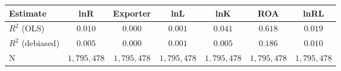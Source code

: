 \begin{tabular}{l*{6}{c}}
\hline\hline
 Estimate & lnR & Exporter & lnL & lnK & ROA & lnRL \\
\hline
\addlinespace $ R^2$ (OLS) & $0.010$ & $0.000$ & $0.001$ & $0.041$ & $0.618$ & $0.019$ \\
$ R^2$ (debiased) & $0.005$ & $0.000$ & $0.001$ & $0.005$ & $0.186$ & $0.010$ \\
N & $1,795,478$ & $1,795,478$ & $1,795,478$ & $1,795,478$ & $1,795,478$ & $1,795,478$ \\
\hline\hline
\end{tabular}
